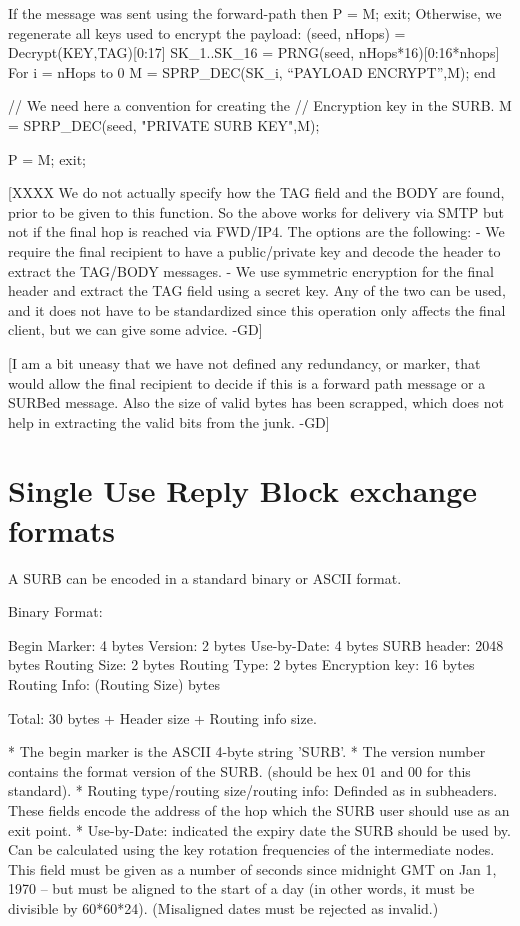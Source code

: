 	If the message was sent using the forward-path then 
		P = M; exit;
	Otherwise, we regenerate all keys used to encrypt the payload:
		(seed, nHops) = Decrypt(KEY,TAG)[0:17]
		SK_1..SK_16 = PRNG(seed, nHops*16)[0:16*nhops]
		For i = nHops to 0
			M = SPRP_DEC(SK_i, ``PAYLOAD ENCRYPT'',M);
		end

		// We need here a convention for creating the
		//   Encryption key in the SURB.
		M = SPRP_DEC(seed, "PRIVATE SURB KEY",M);
		
		P = M; exit;

[XXXX We do not actually specify how the TAG field and the BODY are
found, prior to be given to this function. So the above works for
delivery via SMTP but not if the final hop is reached via FWD/IP4. The
options are the following: 
	- We require the final recipient to have a public/private key
	  and decode the header to extract the TAG/BODY messages.
	- We use symmetric encryption for the final header and extract
	  the TAG field using a secret key.
Any of the two can be used, and it does not have to be standardized
since this operation only affects the final client, but we can give
some advice. -GD]

[I am a bit uneasy that we have not defined any redundancy, or marker,
that would allow the final recipient to decide if this is a forward
path message or a SURBed message. Also the size of valid bytes has
been scrapped, which does not help in extracting the valid bits from
the junk. -GD]

\section{Single Use Reply Block exchange formats}

A SURB can be encoded in a standard binary or ASCII format.

Binary Format:

   Begin Marker: 4 bytes
   Version:      2 bytes
   Use-by-Date:  4 bytes
   SURB header:  2048 bytes
   Routing Size: 2 bytes
   Routing Type: 2 bytes
   Encryption key: 16 bytes
   Routing Info: (Routing Size) bytes

   Total: 30 bytes + Header size + Routing info size.

* The begin marker is the ASCII 4-byte string 'SURB'. 
* The version number contains the format version of the SURB.
  (should be hex 01 and 00 for this standard).
* Routing type/routing size/routing info: Definded as in subheaders.  
  These fields encode the address of the hop which the SURB user should
  use as an exit point.
* Use-by-Date: indicated the expiry date the SURB should be used by. Can
  be calculated using the key rotation frequencies of the intermediate
  nodes.  This field must be given as a number of seconds since
  midnight GMT on Jan 1, 1970 -- but must be aligned to the start of a
  day (in other words, it must be divisible by 60*60*24).
  (Misaligned dates must be rejected as invalid.)


